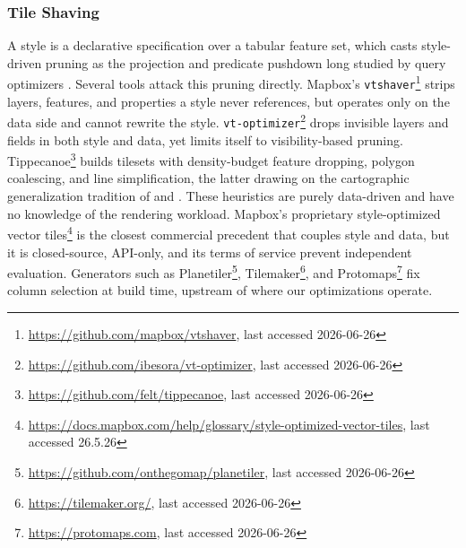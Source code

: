 \subsubsection{Tile Shaving}
A style is a declarative specification over a tabular feature set, which casts style-driven pruning as the projection and predicate pushdown long studied by query optimizers \citep{piraheshExtensibleRuleBased1992,graefeQueryEvaluationTechniques1993,armbrustSparkSQLRelational2015}.
Several tools attack this pruning directly.
Mapbox's \texttt{vtshaver}\footnote{\url{https://github.com/mapbox/vtshaver}, last accessed 2026-06-26} strips layers, features, and properties a style never references, but operates only on the data side and cannot rewrite the style.
\texttt{vt-optimizer}\footnote{\url{https://github.com/ibesora/vt-optimizer}, last accessed 2026-06-26} drops invisible layers and fields in both style and data, yet limits itself to visibility-based pruning.
Tippecanoe\footnote{\url{https://github.com/felt/tippecanoe}, last accessed 2026-06-26} builds tilesets with density-budget feature dropping, polygon coalescing, and line simplification, the latter drawing on the cartographic generalization tradition of \citet{douglasALGORITHMSREDUCTIONNUMBER1973} and  \citet{visvalingamLineGeneralisationRepeated1993}.
These heuristics are purely data-driven and have no knowledge of the rendering workload.
Mapbox's proprietary style-optimized vector tiles\footnote{\url{https://docs.mapbox.com/help/glossary/style-optimized-vector-tiles}, last accessed 26.5.26} is the closest commercial precedent that couples style and data, but it is closed-source, API-only, and its terms of service prevent independent evaluation.
Generators such as Planetiler\footnote{\url{https://github.com/onthegomap/planetiler}, last accessed 2026-06-26}, Tilemaker\footnote{\url{https://tilemaker.org/}, last accessed 2026-06-26}, and Protomaps\footnote{\url{https://protomaps.com}, last accessed 2026-06-26} fix column selection at build time, upstream of where our optimizations operate.

